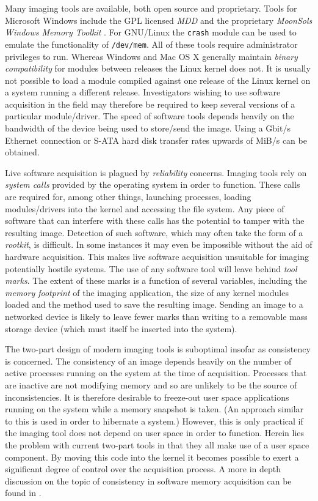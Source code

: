 \documentclass[numbers=noenddot,      %
               abstract,              %
               captions=tableheading, %
               DIV=8]                 %
              {scrartcl}
\begin{document}
Many imaging tools are available, both open source and
proprietary. Tools for Microsoft Windows include the GPL licensed
\emph{MDD} \citep{mantech09} and the proprietary \emph{MoonSols Windows
  Memory Toolkit} \citep{moonsols10}. For GNU/Linux the \verb:crash:
module \citep{anderson08} can be used to emulate the functionality of
\verb:/dev/mem:. All of these tools require administrator privileges to
run. Whereas Windows and Mac OS X generally maintain \emph{binary
  compatibility} for modules between releases the Linux kernel does
not. It is usually not possible to load a module compiled against one
release of the Linux kernel on a system running a different
release. Investigators wishing to use software acquisition in the field
may therefore be required to keep several versions of a particular
module/driver. The speed of software tools depends heavily on the
bandwidth of the device being used to store/send the image. Using a
\unit[1]{Gbit/s} Ethernet connection or S-ATA hard disk transfer rates
upwards of \unit[80]{MiB/s} can be obtained.

Live software acquisition is plagued by \emph{reliability}
concerns. Imaging tools rely on \emph{system calls} provided by the
operating system in order to function. These calls are required for,
among other things, launching processes, loading modules/drivers into
the kernel and accessing the file system. Any piece of software that can
interfere with these calls has the potential to tamper with the
resulting image. Detection of such software, which may often take the
form of a \emph{rootkit}, is difficult. In some instances it may even be
impossible without the aid of hardware acquisition. This makes live
software acquisition unsuitable for imaging potentially hostile
systems. The use of any software tool will leave behind \emph{tool
  marks}. The extent of these marks is a function of several variables,
including the \emph{memory footprint} of the imaging application, the
size of any kernel modules loaded and the method used to save the
resulting image.  Sending an image to a networked device is likely to
leave fewer marks than writing to a removable mass storage device (which
must itself be inserted into the system).

The two-part design of modern imaging tools is suboptimal insofar as
consistency is concerned. The consistency of an image depends heavily on
the number of active processes running on the system at the time of
acquisition. Processes that are inactive are not modifying memory and so
are unlikely to be the source of inconsistencies. It is therefore
desirable to freeze-out user space applications running on the system
while a memory snapshot is taken. (An approach similar to this is used
in order to hibernate a system.) However, this is only practical if the
imaging tool does not depend on user space in order to function. Herein
lies the problem with current two-part tools in that they all make use
of a user space component. By moving this code into the kernel it
becomes possible to exert a significant degree of control over the
acquisition process. A more in depth discussion on the topic of
consistency in software memory acquisition can be found in
\cite{huebner07}.
\end{document}
